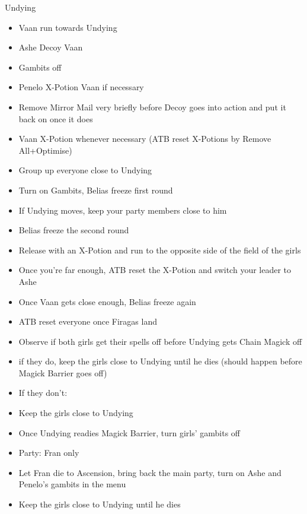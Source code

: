 \begin{battle}{Undying}
\begin{itemize}
	\item  Vaan run towards Undying
	\item  Ashe Decoy Vaan
	\item  Gambits off
	\item  Penelo X-Potion Vaan if necessary
	\item  Remove Mirror Mail very briefly before Decoy goes into action and put it back on once it does
	\item  Vaan X-Potion whenever necessary (ATB reset X-Potions by Remove All+Optimise)
	\item  Group up everyone close to Undying
	\item  Turn on Gambits, Belias freeze first round
	\item  If Undying moves, keep your party members close to him
	\item  Belias freeze the second round
	\item  Release with an X-Potion and run to the opposite side of the field of the girls
	\item  Once you're far enough, ATB reset the X-Potion and switch your leader to Ashe
	\item  Once Vaan gets close enough, Belias freeze again
	\item  ATB reset everyone once Firagas land
	\item  Observe if both girls get their spells off before Undying gets Chain Magick off
		\item  if they do, keep the girls close to Undying until he dies (should happen before Magick Barrier goes off)
	\item  If they don't:
		\item  Keep the girls close to Undying
		\item  Once Undying readies Magick Barrier, turn girls' gambits off
		\item  Party: Fran only
		\item  Let Fran die to Ascension, bring back the main party, turn on Ashe and Penelo's gambits in the menu
		\item  Keep the girls close to Undying until he dies
\end{itemize}

\end{battle}